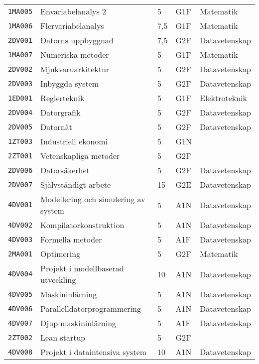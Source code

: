 {\begin{tabular}[]{@{}lllll@{}}
\texttt{1MA005} & Envariabelanalys 2                                    & 5   & G1F & Matematik \tabularnewline     
\texttt{1MA006} & Flervariabelanalys                                    & 7,5 & G1F & Matematik \tabularnewline     
\texttt{2DV001} & Datorns uppbyggnad                                    & 7,5 & G2F & Datavetenskap \tabularnewline 
\midrule
\texttt{1MA007} & Numeriska metoder                                     & 5   & G1F & Matematik \tabularnewline     
\texttt{2DV002} & Mjukvaruarkitektur                                    & 5   & G2F & Datavetenskap \tabularnewline 
\texttt{2DV003} & Inbyggda system                                       & 5   & G2F & Datavetenskap \tabularnewline 
\texttt{1ED001} & Reglerteknik                                          & 5   & G1F & Elektroteknik \tabularnewline 
\texttt{2DV004} & Datorgrafik                                           & 5   & G2F & Datavetenskap \tabularnewline 
\texttt{2DV005} & Datornät                                              & 5   & G2F & Datavetenskap \tabularnewline 
\texttt{1ZT003} & Industriell ekonomi                                   & 5   & G1N & \tabularnewline           
\texttt{2ZT001} & Vetenskapliga metoder                                 & 5   & G2F & \tabularnewline               
\texttt{2DV006} & Datorsäkerhet                                         & 5   & G2F & Datavetenskap \tabularnewline 
\texttt{2DV007} & Självständigt arbete                                  & 15  & G2E & Datavetenskap \tabularnewline 
\midrule
\texttt{4DV001} & Modellering och simulering av system                  & 5   & A1N & Datavetenskap \tabularnewline 
\texttt{4DV002} & Kompilatorkonstruktion                                & 5   & A1N & Datavetenskap \tabularnewline 
\texttt{4DV003} & Formella metoder                                      & 5   & A1F & Datavetenskap \tabularnewline 
\texttt{2MA001} & Optimering                                            & 5   & G2F & Matematik \tabularnewline     
\texttt{4DV004} & Projekt i modellbaserad utveckling                    & 10  & A1N & Datavetenskap \tabularnewline 
\texttt{4DV005} & Maskininlärning                                       & 5   & A1N & Datavetenskap \tabularnewline 
\texttt{4DV006} & Parallelldatorprogrammering                           & 5   & A1N & Datavetenskap \tabularnewline 
\texttt{4DV007} & Djup maskininlärning                                  & 5   & A1F & Datavetenskap \tabularnewline 
\texttt{2ZT002} & Lean startup                                          & 5   & G2F &  \tabularnewline 
\texttt{4DV008} & Projekt i dataintensiva system                        & 10  & A1N & Datavetenskap \tabularnewline 

\end{tabular}}
